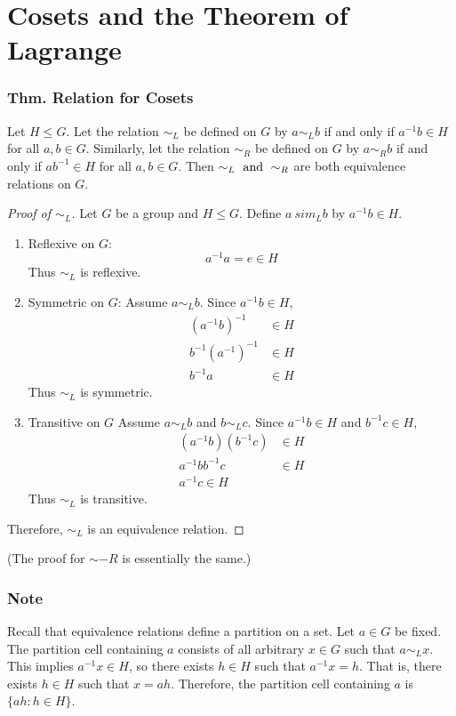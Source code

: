 \section{Cosets and the Theorem of Lagrange}

\subsubsection{Thm. Relation for Cosets}
Let $H \leq G$. Let the relation $\sim_L$ be defined on $G$ by $a \sim_L b$ if and only if $a^{-1}b \in H$ for all $a,b \in G$. Similarly, let the relation $\sim_R$ be defined on $G$ by $a \sim_R b$ if and only if $ab^{-1} \in H$ for all $a,b \in G$. Then $\sim_L \operatorname{~\text{and}~} \sim_R$ are both equivalence relations on $G$.

\begin{proof}[Proof of $\sim_L$]
    Let $G$ be a group and $H \leq G$. Define $a\ sim_L b$ by $a^{-1}b \in H$.
    \begin{enumerate}
        \item Reflexive on $G$:
        \[
            a^{-1}a = e \in H
        \]
        Thus $\sim_L$ is reflexive.
        \item Symmetric on $G$: Assume $a \sim_L b$. Since $a^{-1}b \in H$,
        \begin{align*}
            (a^{-1}b)^{-1} & \in H \\
            b^{-1}(a^{-1})^{-1} & \in H \\
            b^{-1}a & \in H
        \end{align*}
        Thus $\sim_L$ is symmetric.
        \item Transitive on $G$ Assume $a \sim_L b$ and $b \sim_L c$. Since $a^{-1}b \in H$ and $b^{-1}c \in H$,
        \begin{align*}
            (a^{-1}b)(b^{-1}c) & \in H \\
            a^{-1}bb^{-1}c & \in H \\
            a^{-1}c \in H
        \end{align*}
        Thus $\sim_L$ is transitive.
    \end{enumerate}
    Therefore, $\sim_L$ is an equivalence relation.
\end{proof}
(The proof for $\sim-R$ is essentially the same.)

\subsubsection*{Note}
Recall that equivalence relations define a partition on a set. Let $a \in G$ be fixed. The partition cell containing $a$ consists of all arbitrary $x \in G$ such that $a \sim_L x$. This implies $a^{-1}x \in H$, so there exists $h \in H$ such that $a^{-1}x = h$. That is, there exists $h \in H$ such that $x = ah$. Therefore, the partition cell containing $a$ is $\{ah : h \in H\}$.

